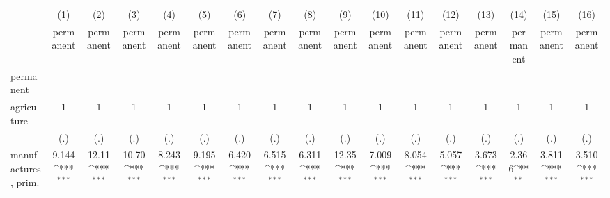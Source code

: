 {
\def\sym#1{\ifmmode^{#1}\else\(^{#1}\)\fi}
\begin{tabular}{l*{16}{c}}
\hline\hline
                    &\multicolumn{1}{c}{(1)}&\multicolumn{1}{c}{(2)}&\multicolumn{1}{c}{(3)}&\multicolumn{1}{c}{(4)}&\multicolumn{1}{c}{(5)}&\multicolumn{1}{c}{(6)}&\multicolumn{1}{c}{(7)}&\multicolumn{1}{c}{(8)}&\multicolumn{1}{c}{(9)}&\multicolumn{1}{c}{(10)}&\multicolumn{1}{c}{(11)}&\multicolumn{1}{c}{(12)}&\multicolumn{1}{c}{(13)}&\multicolumn{1}{c}{(14)}&\multicolumn{1}{c}{(15)}&\multicolumn{1}{c}{(16)}\\
                    &\multicolumn{1}{c}{permanent}&\multicolumn{1}{c}{permanent}&\multicolumn{1}{c}{permanent}&\multicolumn{1}{c}{permanent}&\multicolumn{1}{c}{permanent}&\multicolumn{1}{c}{permanent}&\multicolumn{1}{c}{permanent}&\multicolumn{1}{c}{permanent}&\multicolumn{1}{c}{permanent}&\multicolumn{1}{c}{permanent}&\multicolumn{1}{c}{permanent}&\multicolumn{1}{c}{permanent}&\multicolumn{1}{c}{permanent}&\multicolumn{1}{c}{permanent}&\multicolumn{1}{c}{permanent}&\multicolumn{1}{c}{permanent}\\
\hline
permanent           &                     &                     &                     &                     &                     &                     &                     &                     &                     &                     &                     &                     &                     &                     &                     &                     \\
agriculture         &           1         &           1         &           1         &           1         &           1         &           1         &           1         &           1         &           1         &           1         &           1         &           1         &           1         &           1         &           1         &           1         \\
                    &         (.)         &         (.)         &         (.)         &         (.)         &         (.)         &         (.)         &         (.)         &         (.)         &         (.)         &         (.)         &         (.)         &         (.)         &         (.)         &         (.)         &         (.)         &         (.)         \\
[1em]
manufactures, prim. &       9.144\sym{***}&       12.11\sym{***}&       10.70\sym{***}&       8.243\sym{***}&       9.195\sym{***}&       6.420\sym{***}&       6.515\sym{***}&       6.311\sym{***}&       12.35\sym{***}&       7.009\sym{***}&       8.054\sym{***}&       5.057\sym{***}&       3.673\sym{***}&       2.366\sym{**} &       3.811\sym{***}&       3.510\sym{***}\\

\end{tabular}}
